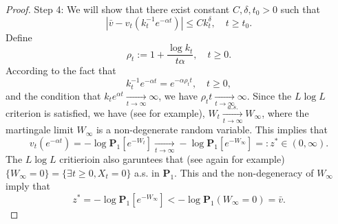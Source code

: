 \documentclass[12pt,a4paper]{amsart}
\theoremstyle{plain}
\theoremstyle{definition}
\numberwithin{equation}{section}
\begin{document}
\begin{proof}
    Step 4: We will show that there exist constant $C, \delta,t_0>0$ such that
\[
    |\bar v - v_t(k_t^{-1} e^{-\alpha t})|\leq Ck_t^\delta, \quad t\geq t_0.
\]
    Define
\[
    \rho_t := 1+ \frac{\log k_t}{t\alpha}, \quad t\geq 0.
\]
    According to the fact that
\[
    k_t^{-1}e^{-\alpha t} = e^{-\alpha \rho_t t}, \quad t\geq 0,
\]
    and the condition that $k_t e^{\alpha t} \xrightarrow[t\to \infty]{} \infty$, we have $\rho_t t \xrightarrow[t\to \infty]{} \infty $.
    Since the $L\log L$ criterion is satisfied, we have (see \cite{LiuRenSong2009Llog} for example), $W_t \xrightarrow[t\to \infty]{a.s.} W_\infty$, where the martingale limit $W_\infty$ is a non-degenerate random variable. This implies that
\[
    v_t(e^{-\alpha t}) = -\log \mathbf P_1[e^{-W_t}]\xrightarrow[t\to \infty]{} - \log \mathbf P_{1}[e^{-W_\infty}] =: z^* \in (0,\infty).
\]
    The $L \log L$ critierioin also garuntees that (see again \cite{LiuRenSong2009Llog} for example) $\{W_\infty = 0\} = \{\exists t \geq 0, X_t= 0\}$  a.s. in $\mathbf P_1$. This and the non-degeneracy of $W_\infty$ imply that
\[
    z^*=-\log \mathbf P_1[e^{-W_\infty}] < -\log \mathbf P_1(W_\infty = 0) = \bar v.
\]


\end{proof}
\end{document}
